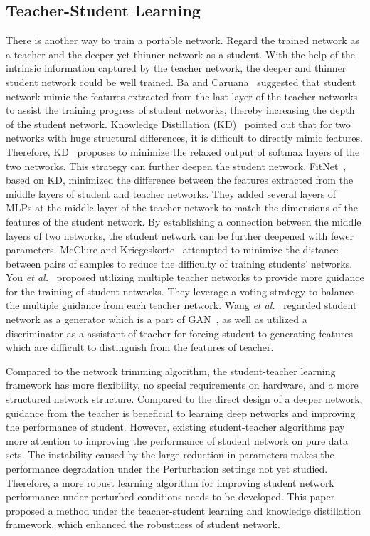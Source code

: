 \documentclass[journal]{IEEEtran}
\begin{document}
\subsection{Teacher-Student Learning}
There is another way to train a portable network. Regard the trained network as a teacher and the deeper yet thinner network as a student. With the help of the intrinsic information captured by the teacher network, the deeper and thinner student network could be well trained. Ba and Caruana~\cite{NIPS2014_5484} suggested that student network mimic the features extracted from the last layer of the teacher networks to assist the training progress of student networks, thereby increasing the depth of the student network. 
Knowledge Distillation (KD)~\cite{hinton2015distilling} pointed out that for two networks with huge structural differences, it is difficult to directly mimic features. Therefore, KD~\cite{hinton2015distilling} proposes to minimize the relaxed output of softmax layers of the two networks. This strategy can further deepen the student network. 
FitNet~\cite{romero2014fitnets}, based on KD, minimized the difference between the features extracted from the middle layers of student and teacher networks. They added several layers of MLPs at the middle layer of the teacher network to match the dimensions of the features of the student network. By establishing a connection between the middle layers of two networks, the student network can be further deepened with fewer parameters. 
McClure and Kriegeskorte~\cite{mcclure2016representational} attempted to minimize the distance between pairs of samples to reduce the difficulty of training students' networks. You \emph{et al.}~\cite{you2017learning} proposed utilizing multiple teacher networks to provide more guidance for the training of student networks. They leverage a voting strategy to balance the multiple guidance from each teacher network. Wang \emph{et al.}~\cite{wangAAAI18} regarded student network as a generator which is a part of GAN~\cite{NIPS2014_5423}, as well as utilized a discriminator as a assistant of teacher for forcing student to generating features which are difficult to distinguish from the features of teacher.

Compared to the network trimming algorithm, the student-teacher learning framework has more flexibility, no special requirements on hardware, and a more structured network structure. Compared to the direct design of a deeper network, guidance from the teacher is beneficial to learning deep networks and improving the performance of student. However, existing student-teacher algorithms pay more attention to improving the performance of student network on pure data sets. The instability caused by the large reduction in parameters makes the performance degradation under the Perturbation settings not yet studied. Therefore, a more robust learning algorithm for improving student network performance under perturbed conditions needs to be developed. This paper proposed a method under the teacher-student learning and knowledge distillation framework, which enhanced the robustness of student network.
\end{document}
